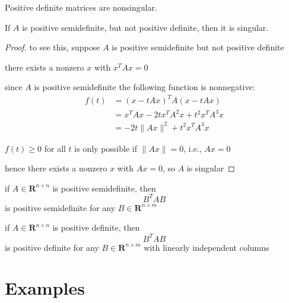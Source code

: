 \begin{theorem}
    Positive definite matrices are nonsingular.
\end{theorem}

\begin{theorem}
    If $A$ is positive semidefinite, but not positive definite, then it is singular.
\end{theorem}

\begin{proof}
    to see this, suppose $ A $ is positive semidefinite but not positive definite

    there exists a nonzero $ x $ with $ x^{T} A x=0 $


since $ A $ is positive semidefinite the following function is nonnegative:
\begin{equation}
\begin{aligned}
f(t) &=(x-t A x)^{T} A(x-t A x) \\
&=x^{T} A x-2 t x^{T} A^{2} x+t^{2} x^{T} A^{3} x \\
&=-2 t\|A x\|^{2}+t^{2} x^{T} A^{3} x
\end{aligned}
\end{equation}

$ f(t) \geq 0 $ for all $ t $ is only possible if $ \|A x\|=0 $, i.e., $ A x=0 $

hence there exists a nonzero $ x $ with $ A x=0 $, so $ A $ is singular
\end{proof}

\begin{corollary}
    if $ A \in \mathbf{R}^{n \times n} $ is positive semidefinite, then
\begin{equation}
B^{T} A B
\end{equation}
is positive semidefinite for any $ B \in \mathbf{R}^{n \times m} $
\end{corollary}

\begin{corollary}
    if $ A \in \mathbf{R}^{n \times n} $ is positive definite, then
\begin{equation}
B^{T} A B
\end{equation}
is positive definite for any $ B \in \mathbf{R}^{n \times m} $ with linearly independent columns
\end{corollary}

\section{Examples}

